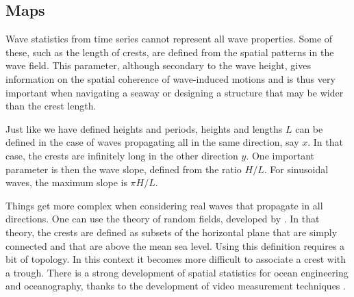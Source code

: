 \subsection{Maps}
Wave statistics from time series cannot represent all wave properties. Some of these, such as the 
length of crests, are defined from the spatial 
patterns in the wave field. This parameter, although secondary to the wave height, gives information 
on the spatial coherence of wave-induced motions and is thus very important when navigating a seaway or designing 
a structure that may be wider than the crest length.
 
Just like we have defined heights and periods, heights and lengths $L$ can be defined 
in the case of waves propagating all in the same direction, say $x$. In that case, the crests are infinitely long in the other 
direction $y$. One important parameter is then the wave slope, defined from the ratio $H/L$. For sinusoidal waves, the maximum 
slope is $\pi H/ L$. 

Things get more complex when considering real waves that propagate in all directions. 
One can use the theory of random fields, developed by \cite{Adler1981}. In that theory, the crests are defined 
as subsets of the horizontal plane that are simply connected and that are above the mean sea level. Using this definition 
requires a bit of topology. In this context it becomes more difficult to associate a crest with a trough. 
There is a strong development of spatial statistics for ocean engineering and oceanography, thanks to the development of video measurement techniques \citep{Fedele&al.2009a}. 
